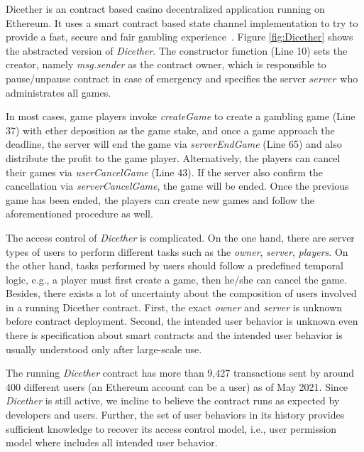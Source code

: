 Dicether is an contract based casino decentralized application running on Ethereum.
It uses a smart contract based state channel implementation to try to provide a fast, secure and fair gambling experience~\cite{Dicether2018}.
Figure \ref{fig:Dicether} shows the abstracted version of \textit{Dicether}.
The constructor function (Line 10) sets the creator, namely \textit{msg.sender} as the contract owner, which is responsible to pause/unpause contract in case of emergency and specifies the server ${server}$ who administrates all games.

In most cases, game players invoke \textit{createGame} to create a gambling game (Line 37) with ether deposition as the game stake,
and once a game approach the deadline, the server will end the game via \textit{serverEndGame} (Line 65) and also distribute the profit to the game player.
Alternatively, the players can cancel their games via \textit{userCancelGame} (Line 43).
If the server also confirm the cancellation via \textit{serverCancelGame}, the game will be ended.
Once the previous game has been ended, the players can create new games and follow the aforementioned procedure as well.

The access control of \textit{Dicether} is complicated.
On the one hand, there are server types of users to perform different tasks such as the \textit{owner}, \textit{server},  \textit{players}.
On the other hand, tasks performed by users should follow a predefined temporal logic, e.g., a player must first create a game, then he/she can cancel the game.
Besides, there exists a lot of uncertainty about the composition of users involved in a running Dicether contract.
First, the exact \textit{owner} and \textit{server} is unknown before contract deployment.
Second, the intended user behavior is unknown even there is  specification about smart contracts and the intended user behavior is usually understood only after large-scale use.

The running \textit{Dicether} contract has more than 9,427 transactions sent by around 400 different users (an Ethereum account can be a user) as of May 2021.
Since \textit{Dicether} is still active, we incline to believe the contract runs as expected by developers and users.
Further, the set of user behaviors in its history provides sufficient knowledge to recover its access control model, i.e., user permission model where includes all intended user behavior.

